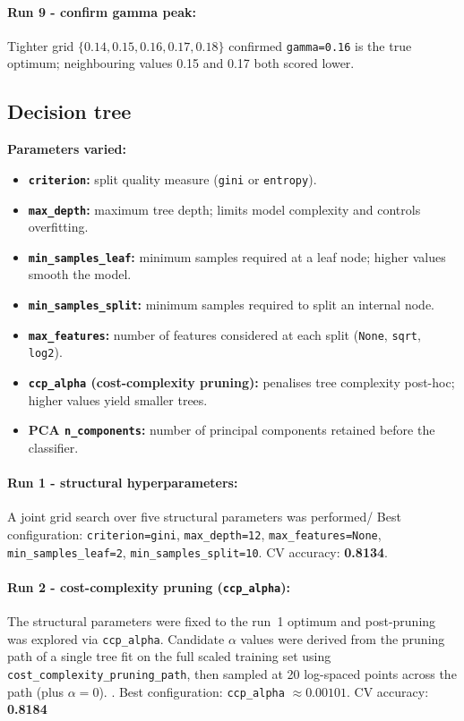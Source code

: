 \documentclass[11pt]{article}
\begin{document}
\paragraph{Run 9 - confirm gamma peak:}
Tighter grid $\{0.14, 0.15, 0.16, 0.17, 0.18\}$ confirmed \texttt{gamma=0.16} is the true optimum;
neighbouring values 0.15 and 0.17 both scored lower.


\subsection{Decision tree}
\label{sec:dt}

\textbf{Parameters varied:}
\begin{itemize}
  \item \textbf{\texttt{criterion}:} split quality measure (\texttt{gini} or \texttt{entropy}).
  \item \textbf{\texttt{max\_depth}:} maximum tree depth; limits model complexity and controls overfitting.
  \item \textbf{\texttt{min\_samples\_leaf}:} minimum samples required at a leaf node; higher values smooth the model.
  \item \textbf{\texttt{min\_samples\_split}:} minimum samples required to split an internal node.
  \item \textbf{\texttt{max\_features}:} number of features considered at each split (\texttt{None}, \texttt{sqrt}, \texttt{log2}).
  \item \textbf{\texttt{ccp\_alpha} (cost-complexity pruning):} penalises tree complexity post-hoc; higher values yield smaller trees.
  \item \textbf{PCA \texttt{n\_components}:} number of principal components retained before the classifier.
\end{itemize}

\paragraph{Run 1 - structural hyperparameters:}
A joint grid search over five structural parameters was performed/ Best configuration: \texttt{criterion=gini}, \texttt{max\_depth=12}, \texttt{max\_features=None}, \texttt{min\_samples\_leaf=2}, \texttt{min\_samples\_split=10}.
CV accuracy: \textbf{0.8134}.

\paragraph{Run 2 - cost-complexity pruning (\texttt{ccp\_alpha}):}
The structural parameters were fixed to the run~1 optimum and post-pruning was explored via \texttt{ccp\_alpha}.
Candidate $\alpha$ values were derived from the pruning path of a single tree fit on the full scaled training set using \texttt{cost\_complexity\_pruning\_path}, then sampled at 20 log-spaced points across the path (plus $\alpha = 0$).
. Best configuration: \texttt{ccp\_alpha} $\approx 0.00101$. CV accuracy: \textbf{0.8184} 
\end{document}
